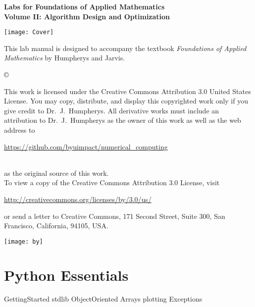\documentclass[nociteref]{SIAM-GH-book}
\begin{document}

\thispagestyle{empty} %

\begin{center}
{\huge \bf Labs for Foundations of Applied Mathematics} \\
\vspace{5mm}
{\Large \bf Volume II: Algorithm Design and Optimization}
\vspace{20mm}

\texttt{[image: Cover]}
\end{center}
\frontmatter



\begin{thepreface} %

This lab manual is designed to accompany the textbook \emph{Foundations of Applied Mathematics} by Humpherys and Jarvis.

\vfill
\copyright{This work is licensed under the Creative Commons Attribution 3.0 United States
License.  You may copy, distribute, and display this copyrighted work only if you give
credit to Dr.~J.~Humpherys. All derivative works must include an attribution to Dr.~J.~Humpherys as the owner of this work as well as the web address to
\\\centerline{\url{https://github.com/byuimpact/numerical_computing}}\\ as the original source of
this
work.\\To view a copy of the Creative Commons Attribution 3.0 License,
visit\\\centerline{\url{http://creativecommons.org/licenses/by/3.0/us/}} or send a letter to
Creative Commons, 171 Second Street, Suite 300, San Francisco, California, 94105, USA.}

\vfill
\centering\texttt{[image: by]}
\vfill
\end{thepreface}

\setcounter{tocdepth}{1}
\tableofcontents

\mainmatter


\part{Python Essentials}
{GettingStarted}
{stdlib}
{ObjectOriented}
{Arrays}
{plotting}
{Exceptions}
\end{document}
